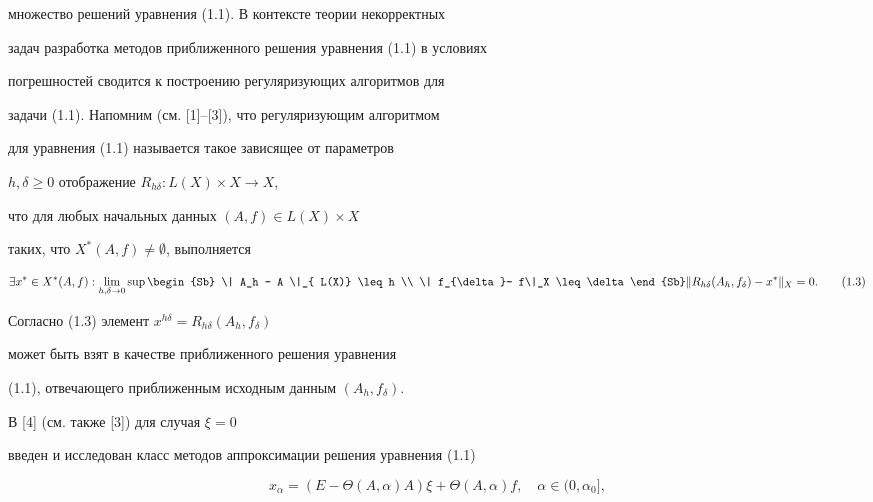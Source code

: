 множество решений уравнения (1.1). В контексте теории некорректных


задач разработка методов приближенного решения уравнения (1.1) в условиях


погрешностей сводится к построению регуляризующих алгоритмов для


задачи (1.1). Напомним (см. [1]--[3]), что регуляризующим алгоритмом


для уравнения (1.1) называется такое зависящее от параметров


$h, \delta \geq 0$ отображение $R_{h \delta}: L(X) \times X \to X$,


что для любых начальных данных $(A,f) \in {L(X) \times X}$


таких, что $X^{*}(A,f) \ne \emptyset$, выполняется


\begin{equation}


\exists x^{*} \in X^{*}(A,f):


\lim \limits_{h, \delta \to 0} 


\sup \begin{Sb} \| A_h - A \|_{ L(X)} \leq h \\


\| f_{\delta}-  f\|_X  \leq  \delta \end{Sb}


\| R_{h \delta}(A_h,f_{\delta})- x^{*}\|_X =0.


\tag{1.3}


\end{equation}


Согласно (1.3) элемент $x^{h \delta}=R_{h \delta}(A_h,f_{\delta})$


может быть взят в качестве приближенного решения уравнения


(1.1), отвечающего приближенным исходным данным $(A_h,f_{\delta})$.





В [4] (см. также [3]) для случая $\xi =0$


введен и исследован класс методов аппроксимации решения уравнения (1.1)


\begin{equation}


x_{\alpha}=(E-\Theta( A, \alpha)A) \xi +


\Theta( A, \alpha) f, \quad \alpha \in (0,\alpha_0],\tag{1.4}


\end{equation}


